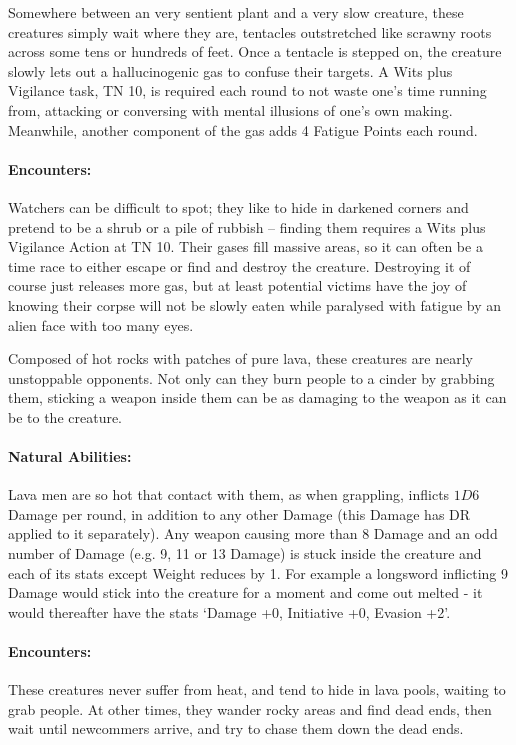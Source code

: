 \begin{multicols}{2}
\label{watcher}

Somewhere between an very sentient plant and a very slow creature, these creatures simply wait where they are, tentacles outstretched like scrawny roots across some tens or hundreds of feet.  Once a tentacle is stepped on, the creature slowly lets out a hallucinogenic gas to confuse their targets.  A Wits plus Vigilance task, TN 10, is required each round to not waste one's time running from, attacking or conversing with mental illusions of one's own making.  Meanwhile, another component of the gas adds 4 Fatigue Points each round.

\paragraph{Encounters:} Watchers can be difficult to spot; they like to hide in darkened corners and pretend to be a shrub or a pile of rubbish -- finding them requires a Wits plus Vigilance Action at TN 10.  Their gases fill massive areas, so it can often be a time race to either escape or find and destroy the creature.  Destroying it of course just releases more gas, but at least potential victims have the joy of knowing their corpse will not be slowly eaten while paralysed with fatigue by an alien face with too many eyes.

\watcher

\label{lavaman}

Composed of hot rocks with patches of pure lava, these creatures are nearly unstoppable opponents.  Not only can they burn people to a cinder by grabbing them, sticking a weapon inside them can be as damaging to the weapon as it can be to the creature.

\paragraph{Natural Abilities:} Lava men are so hot that contact with them, as when grappling, inflicts $1D6$ Damage per round, in addition to any other Damage (this Damage has DR applied to it separately).  Any weapon causing more than 8 Damage and an odd number of Damage (e.g. 9, 11 or 13 Damage) is stuck inside the creature and each of its stats except Weight reduces by 1.  For example a longsword inflicting 9 Damage would stick into the creature for a moment and come out melted - it would thereafter have the stats `Damage +0, Initiative +0, Evasion +2'.

\paragraph{Encounters:} These creatures never suffer from heat, and tend to hide in lava pools, waiting to grab people.  At other times, they wander rocky areas and find dead ends, then wait until newcommers arrive, and try to chase them down the dead ends.

\lavaman

\end{multicols}

